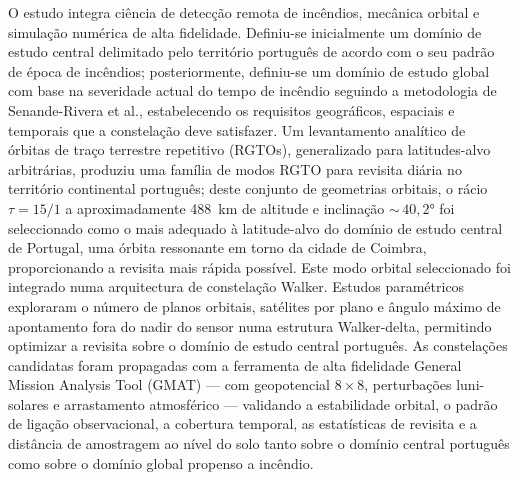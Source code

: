 O estudo integra ciência de detecção remota de incêndios, mecânica orbital e simulação numérica de alta fidelidade.
Definiu-se inicialmente um domínio de estudo central delimitado pelo território português de acordo com o seu padrão de época de incêndios; posteriormente, definiu-se um domínio de estudo global com base na severidade actual do tempo de incêndio seguindo a metodologia de Senande-Rivera et al., estabelecendo os requisitos geográficos, espaciais e temporais que a constelação deve satisfazer.
Um levantamento analítico de órbitas de traço terrestre repetitivo (RGTOs), generalizado para latitudes-alvo arbitrárias, produziu uma família de modos RGTO para revisita diária no território continental português; deste conjunto de geometrias orbitais, o rácio $\tau = 15/1$ a aproximadamente 488~km de altitude e inclinação ${\sim}\,40{,}2°$ foi seleccionado como o mais adequado à latitude-alvo do domínio de estudo central de Portugal, uma órbita ressonante em torno da cidade de Coimbra, proporcionando a revisita mais rápida possível.
Este modo orbital seleccionado foi integrado numa arquitectura de constelação Walker. Estudos paramétricos exploraram o número de planos orbitais, satélites por plano e ângulo máximo de apontamento fora do nadir do sensor numa estrutura Walker-delta, permitindo optimizar a revisita sobre o domínio de estudo central português.
As constelações candidatas foram propagadas com a ferramenta de alta fidelidade General Mission Analysis Tool (GMAT) --- com geopotencial $8\times8$, perturbações luni-solares e arrastamento atmosférico --- validando a estabilidade orbital, o padrão de ligação observacional, a cobertura temporal, as estatísticas de revisita e a distância de amostragem ao nível do solo tanto sobre o domínio central português como sobre o domínio global propenso a incêndio.

